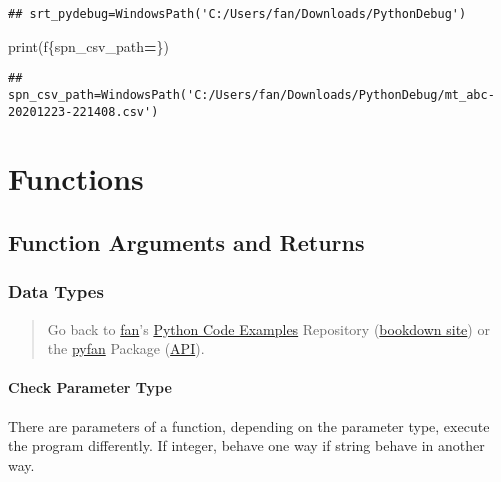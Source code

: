 \documentclass[
]{book}
\newenvironment{Shaded}{\begin{snugshade}}{\end{snugshade}}
\newcommand{\BuiltInTok}[1]{#1}
\newcommand{\NormalTok}[1]{#1}
\newcommand{\OperatorTok}[1]{\textcolor[rgb]{0.81,0.36,0.00}{\textbf{#1}}}
\newcommand{\SpecialCharTok}[1]{\textcolor[rgb]{0.00,0.00,0.00}{#1}}
\newcommand{\SpecialStringTok}[1]{\textcolor[rgb]{0.31,0.60,0.02}{#1}}
\begin{document}
\begin{verbatim}
## srt_pydebug=WindowsPath('C:/Users/fan/Downloads/PythonDebug')
\end{verbatim}

\begin{Shaded}
\begin{Highlighting}[]
\BuiltInTok{print}\NormalTok{(}\SpecialStringTok{f\textquotesingle{}}\SpecialCharTok{\{}\NormalTok{spn\_csv\_path}\OperatorTok{=}\SpecialCharTok{\}}\SpecialStringTok{\textquotesingle{}}\NormalTok{)}
\end{Highlighting}
\end{Shaded}

\begin{verbatim}
## spn_csv_path=WindowsPath('C:/Users/fan/Downloads/PythonDebug/mt_abc-20201223-221408.csv')
\end{verbatim}

\hypertarget{functions}{%
\chapter{Functions}\label{functions}}

\hypertarget{function-arguments-and-returns}{%
\section{Function Arguments and Returns}\label{function-arguments-and-returns}}

\hypertarget{data-types}{%
\subsection{Data Types}\label{data-types}}

\begin{quote}
Go back to \href{http://fanwangecon.github.io/}{fan}'s \href{https://fanwangecon.github.io/Py4Econ/}{Python Code Examples} Repository (\href{https://fanwangecon.github.io/Py4Econ/bookdown}{bookdown site}) or the \href{https://pyfan.readthedocs.io/en/latest/}{pyfan} Package (\href{https://pyfan.readthedocs.io/en/latest/reference.html}{API}).
\end{quote}

\hypertarget{check-parameter-type}{%
\subsubsection{Check Parameter Type}\label{check-parameter-type}}

There are parameters of a function, depending on the parameter type, execute the program differently. If integer, behave one way if string behave in another way.
\end{document}
